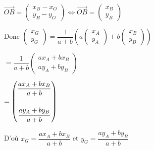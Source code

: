 \documentclass{article}
\begin{document}
\vspace{1em}

\noindent $\overrightarrow{OB} = \begin{pmatrix} x_B - x_O \\ y_B - y_O \end{pmatrix} \iff \overrightarrow{OB} = \begin{pmatrix} x_B \\ y_B \end{pmatrix}$

\vspace{1.5em}

\noindent Donc $\begin{pmatrix} x_G \\ y_G \end{pmatrix} = \dfrac{1}{a + b} \left( a \begin{pmatrix} x_A \\ y_A \end{pmatrix} + b \begin{pmatrix} x_B \\ y_B \end{pmatrix} \right)$

\vspace{1em}

\noindent \phantom{Donc $\begin{pmatrix} x_G \\ y_G \end{pmatrix}$} $= \dfrac{1}{a + b} \begin{pmatrix} a x_A + b x_B \\ a y_A + b y_B \end{pmatrix}$

\vspace{1em}

\noindent \phantom{Donc $\begin{pmatrix} x_G \\ y_G \end{pmatrix}$} $= \begin{pmatrix} \dfrac{a x_A + b x_B}{a + b} \\ \vspace{0.5em} \\ \dfrac{a y_A + b y_B}{a + b} \end{pmatrix}$

\noindent D'où $x_G = \dfrac{a x_A + b x_B}{a + b}$ \quad et \quad $y_G = \dfrac{a y_A + b y_B}{a + b}$

\vspace{2em}
\end{document}
